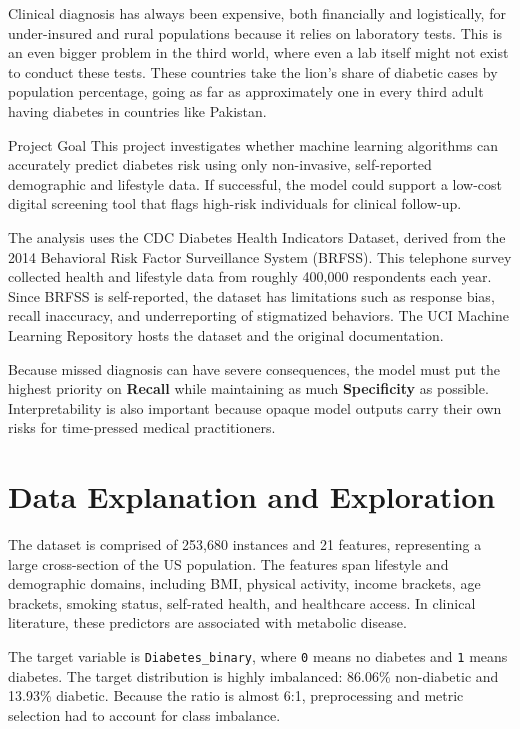 \documentclass[11pt,letterpaper]{article}
\begin{document}
Clinical diagnosis has always been expensive, both financially and logistically, for under-insured and rural populations because it relies on laboratory tests. This is an even bigger problem in the third world, where even a lab itself might not exist to conduct these tests. These countries take the lion's share of diabetic cases by population percentage, going as far as approximately one in every third adult having diabetes in countries like Pakistan.

\begin{insightbox}{Project Goal}
This project investigates whether machine learning algorithms can accurately predict diabetes risk using only non-invasive, self-reported demographic and lifestyle data. If successful, the model could support a low-cost digital screening tool that flags high-risk individuals for clinical follow-up.
\end{insightbox}

The analysis uses the CDC Diabetes Health Indicators Dataset, derived from the 2014 Behavioral Risk Factor Surveillance System (BRFSS). This telephone survey collected health and lifestyle data from roughly 400,000 respondents each year. Since BRFSS is self-reported, the dataset has limitations such as response bias, recall inaccuracy, and underreporting of stigmatized behaviors. The UCI Machine Learning Repository hosts the dataset and the original documentation.

Because missed diagnosis can have severe consequences, the model must put the highest priority on \textbf{Recall} while maintaining as much \textbf{Specificity} as possible. Interpretability is also important because opaque model outputs carry their own risks for time-pressed medical practitioners.

\section{Data Explanation and Exploration}
The dataset is comprised of 253,680 instances and 21 features, representing a large cross-section of the US population. The features span lifestyle and demographic domains, including BMI, physical activity, income brackets, age brackets, smoking status, self-rated health, and healthcare access. In clinical literature, these predictors are associated with metabolic disease.

The target variable is \texttt{Diabetes\_binary}, where \texttt{0} means no diabetes and \texttt{1} means diabetes. The target distribution is highly imbalanced: 86.06\% non-diabetic and 13.93\% diabetic. Because the ratio is almost 6:1, preprocessing and metric selection had to account for class imbalance.
\end{document}
